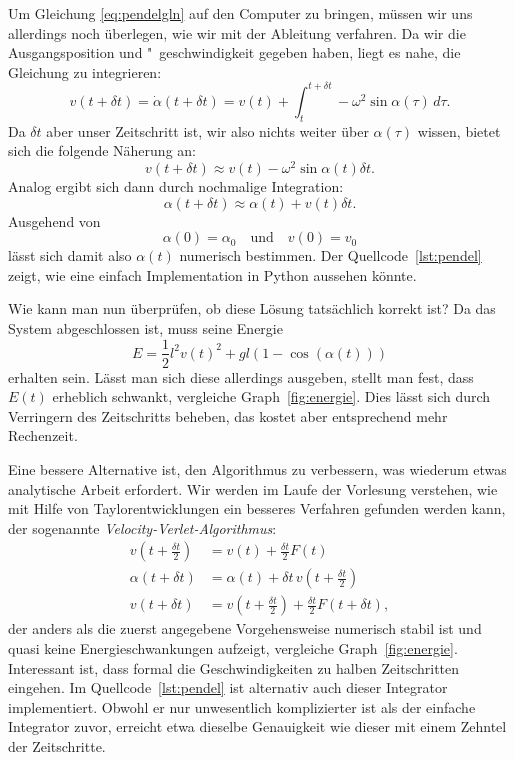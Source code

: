 Um Gleichung \eqref{eq:pendelgln} auf den Computer zu bringen, müssen
wir uns allerdings noch überlegen, wie wir mit der Ableitung verfahren.
Da wir die Ausgangsposition und "~ge\-schwin\-dig\-keit gegeben haben, liegt
es nahe, die Gleichung zu integrieren:
\begin{equation}
  v(t+\delta t) = \dot\alpha(t + \delta t) = v(t) + \int_{t}^{t+\delta t}
  -\omega^2\sin \alpha(\tau)\, d\tau.
\end{equation}
Da $\delta t$ aber unser Zeitschritt ist, wir also nichts weiter über
$\alpha(\tau)$ wissen, bietet sich die folgende Näherung an:
\begin{equation}
  v(t+\delta t) \approx v(t) - \omega^2\sin\alpha(t) \delta t.
\end{equation}
Analog ergibt sich dann durch nochmalige Integration:
\begin{equation}
  \alpha(t+\delta t) \approx \alpha(t) + v(t) \delta t.
  \label{eq:simple}
\end{equation}
Ausgehend von
\begin{equation}
  \alpha(0) = \alpha_0 \quad\text{und}\quad v(0) = v_0
\end{equation}
lässt sich damit also $\alpha(t)$ numerisch bestimmen. Der
Quellcode~\ref{lst:pendel} zeigt, wie eine einfach Implementation in
Python aussehen könnte.

Wie kann man nun überprüfen, ob diese Lösung tatsächlich korrekt ist?
Da das System abgeschlossen ist, muss seine Energie
\begin{equation}
  E = \frac{1}{2} l^2 v(t)^2 + gl (1 - \cos(\alpha(t)))
\end{equation}
erhalten sein. Lässt man sich diese allerdings ausgeben, stellt man
fest, dass $E(t)$ erheblich schwankt, vergleiche
Graph~\ref{fig:energie}. Dies lässt sich durch Verringern des
Zeitschritts beheben, das kostet aber entsprechend mehr Rechenzeit.

Eine bessere Alternative ist, den Algorithmus zu verbessern, was
wiederum etwas analytische Arbeit erfordert. Wir werden im Laufe der
Vorlesung verstehen, wie mit Hilfe von Taylorentwicklungen ein
besseres Verfahren gefunden werden kann, der sogenannte
\emph{Velocity-Verlet-Algorithmus}:
\begin{align}
  v\left(t + \frac{\delta t}{2}\right) &= v(t) + \frac{\delta t}{2} F(t) \\
  \alpha(t + \delta t) &= \alpha(t) + \delta t\, v\left(t + \frac{\delta t}{2}\right) \\
  v(t + \delta t) &= v\left(t + \frac{\delta t}{2}\right) + \frac{\delta t}{2}
  F(t + \delta t),
\end{align}
der anders als die zuerst angegebene Vorgehensweise numerisch stabil
ist und quasi keine Energieschwankungen aufzeigt, vergleiche
Graph~\ref{fig:energie}.  Interessant ist, dass formal die
Geschwindigkeiten zu halben Zeitschritten eingehen. Im
Quellcode~\ref{lst:pendel} ist alternativ auch dieser Integrator
implementiert. Obwohl er nur unwesentlich komplizierter ist als der
einfache Integrator zuvor, erreicht etwa dieselbe Genauigkeit wie
dieser mit einem Zehntel der Zeitschritte.

